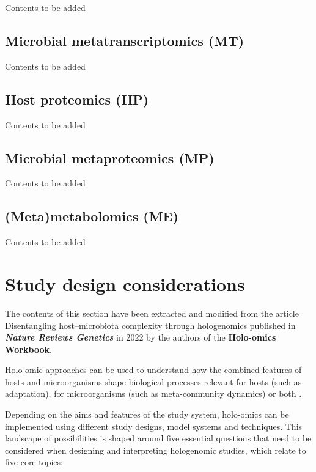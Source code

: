 \documentclass[
]{book}
\begin{document}
Contents to be added

\hypertarget{microbial-metatranscriptomics}{%
\section{Microbial metatranscriptomics (MT)}\label{microbial-metatranscriptomics}}

Contents to be added

\hypertarget{host-proteomics}{%
\section{Host proteomics (HP)}\label{host-proteomics}}

Contents to be added

\hypertarget{microbial-metaproteomics}{%
\section{Microbial metaproteomics (MP)}\label{microbial-metaproteomics}}

Contents to be added

\hypertarget{meta-metabolomics}{%
\section{(Meta)metabolomics (ME)}\label{meta-metabolomics}}

Contents to be added

\hypertarget{study-design-considerations}{%
\chapter{Study design considerations}\label{study-design-considerations}}

The contents of this section have been extracted and modified from the article \href{https://www.nature.com/articles/s41576-021-00421-0}{Disentangling host--microbiota complexity through hologenomics} published in \textbf{\emph{Nature Reviews Genetics}} in 2022 by the authors of the \textbf{Holo-omics Workbook}.

Holo-omic approaches can be used to understand how the combined features of hosts and microorganisms shape biological processes relevant for hosts (such as adaptation), for microorganisms (such as meta-community dynamics) or both \citep{Alberdi2022-ay}.

Depending on the aims and features of the study system, holo-omics can be implemented using different study designs, model systems and techniques. This landscape of possibilities is shaped around five essential questions that need to be considered when designing and interpreting hologenomic studies, which relate to five core topics:
\end{document}
